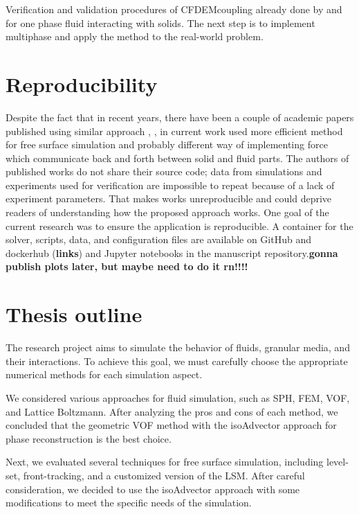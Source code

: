 Verification and validation procedures of CFDEMcoupling \cite{kloss2011liggghts} already done by \cite{hager2014cfd} and \cite{balachandran2021resolved} for one phase fluid interacting with solids. The next step is to implement multiphase and apply the method to the real-world problem.

\section{Reproducibility}

Despite the fact that in recent years, there have been a couple of academic papers published using similar approach \cite{nan2023high}, \cite{mao2020resolved}, in current work used more efficient method for free surface simulation and probably different way of implementing force which communicate back and forth between solid and fluid parts. The authors of published works do not share their source code; data from simulations and experiments used for verification are impossible to repeat because of a lack of experiment parameters. That makes works unreproducible and could deprive readers of understanding how the proposed approach works. One goal of the current research was to ensure the application is reproducible. A container for the solver, scripts, data, and configuration files are available on GitHub and dockerhub (\textbf{links}) and Jupyter notebooks in the manuscript repository.\textbf{gonna publish plots later, but maybe need to do it rn!!!!}

\section{Thesis outline}

The research project aims to simulate the behavior of fluids, granular media, and their interactions. To achieve this goal, we must carefully choose the appropriate numerical methods for each simulation aspect.

We considered various approaches for fluid simulation, such as SPH, FEM, VOF, and Lattice Boltzmann. After analyzing the pros and cons of each method, we concluded that the geometric VOF method with the isoAdvector approach for phase reconstruction is the best choice.

Next, we evaluated several techniques for free surface simulation, including level-set, front-tracking, and a customized version of the LSM. After careful consideration, we decided to use the isoAdvector approach with some modifications to meet the specific needs of the simulation.

